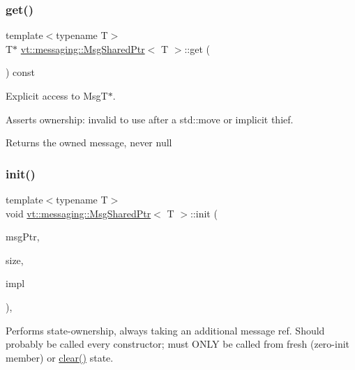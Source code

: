 \subsubsection{\texorpdfstring{get()}{get()}}
{\footnotesize\ttfamily template$<$typename T$>$ \\
T$\ast$ \hyperlink{structvt_1_1messaging_1_1_msg_shared_ptr}{vt\+::messaging\+::\+Msg\+Shared\+Ptr}$<$ T $>$\+::get (\begin{DoxyParamCaption}{ }\end{DoxyParamCaption}) const\hspace{0.3cm}{\ttfamily [inline]}}



Explicit access to Msg\+T$\ast$. 

Asserts ownership\+: invalid to use after a std\+::move or implicit thief.

\begin{DoxyReturn}{Returns}
the owned message, never null 
\end{DoxyReturn}
\mbox{\label{structvt_1_1messaging_1_1_msg_shared_ptr_a780631de45b6dfb6812abb9af26cb4e8}} 
\subsubsection{\texorpdfstring{init()}{init()}}
{\footnotesize\ttfamily template$<$typename T$>$ \\
void \hyperlink{structvt_1_1messaging_1_1_msg_shared_ptr}{vt\+::messaging\+::\+Msg\+Shared\+Ptr}$<$ T $>$\+::init (\begin{DoxyParamCaption}\item[{T $\ast$}]{msg\+Ptr,  }\item[{\hyperlink{namespacevt_aab8d55968084610ce3b17057981e9300}{Byte\+Type}}]{size,  }\item[{\hyperlink{structvt_1_1messaging_1_1_msg_ptr_impl_base}{Msg\+Ptr\+Impl\+Base} $\ast$}]{impl }\end{DoxyParamCaption})\hspace{0.3cm}{\ttfamily [inline]}, {\ttfamily [private]}}

Performs state-\/ownership, always taking an additional message ref. Should probably be called every constructor; must O\+N\+LY be called from fresh (zero-\/init member) or \hyperlink{structvt_1_1messaging_1_1_msg_shared_ptr_ace4439c8585f3d3c50b861570db07d99}{clear()} state. \mbox{\label{structvt_1_1messaging_1_1_msg_shared_ptr_a351f61999bc2f15ec3027fcb76c9a942}} 
